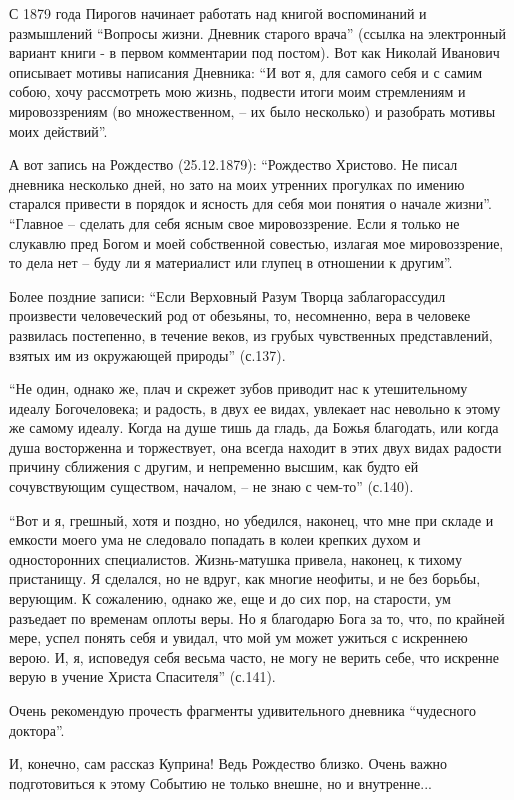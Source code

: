 С 1879 года Пирогов начинает работать над книгой воспоминаний и размышлений
\enquote{Вопросы жизни. Дневник старого врача} (ссылка на электронный вариант книги - в
первом комментарии под постом). Вот как Николай Иванович описывает мотивы
написания Дневника: \enquote{И вот я, для самого себя и с самим собою, хочу рассмотреть
мою жизнь, подвести итоги моим стремлениям и мировоззрениям (во множественном,
– их было несколько) и разобрать мотивы моих действий}.

А вот запись на Рождество (25.12.1879): \enquote{Рождество Христово. Не писал дневника
несколько дней, но зато на моих утренних прогулках по имению старался привести
в порядок и ясность для себя мои понятия о начале жизни}. \enquote{Главное – сделать
для себя ясным свое мировоззрение. Если я только не слукавлю пред Богом и моей
собственной совестью, излагая мое мировоззрение, то дела нет – буду ли я
материалист или глупец в отношении к другим}.

Более поздние записи: \enquote{Если Верховный Разум Творца заблагорассудил произвести
человеческий род от обезьяны, то, несомненно, вера в человеке развилась
постепенно, в течение веков, из грубых чувственных представлений, взятых им из
окружающей природы} (с.137).

\enquote{Не один, однако же, плач и скрежет зубов приводит нас к утешительному идеалу
Богочеловека; и радость, в двух ее видах, увлекает нас невольно к этому же
самому идеалу. Когда на душе тишь да гладь, да Божья благодать, или когда душа
восторженна и торжествует, она всегда находит в этих двух видах радости причину
сближения с другим, и непременно высшим, как будто ей сочувствующим существом,
началом, – не знаю с чем-то} (с.140).

\enquote{Вот и я, грешный, хотя и поздно, но убедился, наконец, что мне при складе и
емкости моего ума не следовало попадать в колеи крепких духом и односторонних
специалистов. Жизнь-матушка привела, наконец, к тихому пристанищу. Я сделался,
но не вдруг, как многие неофиты, и не без борьбы, верующим. К сожалению, однако
же, еще и до сих пор, на старости, ум разъедает по временам оплоты веры. Но я
благодарю Бога за то, что, по крайней мере, успел понять себя и увидал, что мой
ум может ужиться с искреннею верою. И, я, исповедуя себя весьма часто, не могу
не верить себе, что искренне верую в учение Христа Спасителя} (с.141).

Очень рекомендую прочесть фрагменты удивительного дневника \enquote{чудесного доктора}.

И, конечно, сам рассказ Куприна! Ведь Рождество близко. Очень важно
подготовиться к этому Событию не только внешне, но и внутренне...

